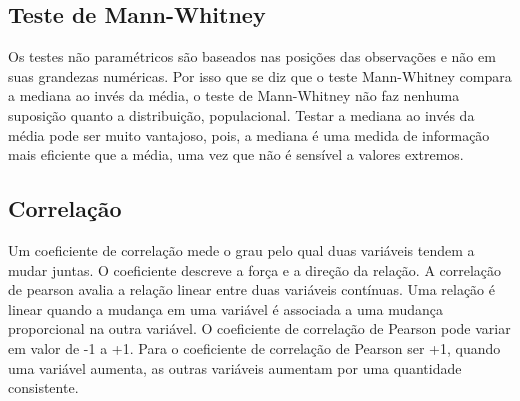 \subsection{Teste de Mann-Whitney}

Os testes não paramétricos são baseados nas posições das observações e não em suas grandezas numéricas. Por isso que se diz que o teste Mann-Whitney compara a mediana ao invés da média, o teste de Mann-Whitney não faz nenhuma suposição quanto a distribuição, populacional.\newline
\indent Testar a mediana ao invés da média pode ser muito vantajoso, pois, a mediana é uma medida de informação mais eficiente que a média, uma vez que não é sensível a valores extremos.

\subsection{Correlação}

Um coeficiente de correlação mede o grau pelo qual duas variáveis tendem a mudar juntas. O coeficiente descreve a força e a direção da relação. \newline
\indent A correlação de pearson avalia a relação linear entre duas variáveis contínuas. Uma relação é linear quando a mudança em uma variável é associada a uma mudança proporcional na outra variável.\newline
\indent O coeficiente de correlação de Pearson pode variar em valor de -1 a +1. Para o coeficiente de correlação de Pearson ser +1, quando uma variável aumenta, as outras variáveis aumentam por uma quantidade consistente.\newline
\indent

